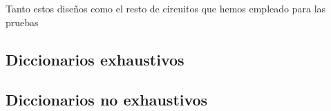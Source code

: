 Tanto estos diseños como el resto de circuitos que hemos empleado para las pruebas

\subsection{Diccionarios exhaustivos}
\label{subsec:LevDicExhaust}


\subsection{Diccionarios no exhaustivos}
\label{subsec:LevDicNoExhaust}


\endinput
